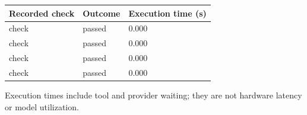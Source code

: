\documentclass[11pt,a4paper]{article}
\begin{document}
{\small\renewcommand{\arraystretch}{1.18}\begin{longtable}{@{}L{0.57\textwidth}|L{0.16\textwidth}|L{0.17\textwidth}@{}}\toprule

\textbf{Recorded check} & \textbf{Outcome} & \textbf{Execution time (\allowbreak{}s)\allowbreak{}}\\\midrule\endhead

check & passed & 0.000\\[2pt]\hline

check & passed & 0.000\\[2pt]\hline

check & passed & 0.000\\[2pt]\hline

check & passed & 0.000\\[2pt]\hline

\bottomrule\end{longtable}}

Execution times include tool and provider waiting; they are not hardware latency or model utilization.
\end{document}

